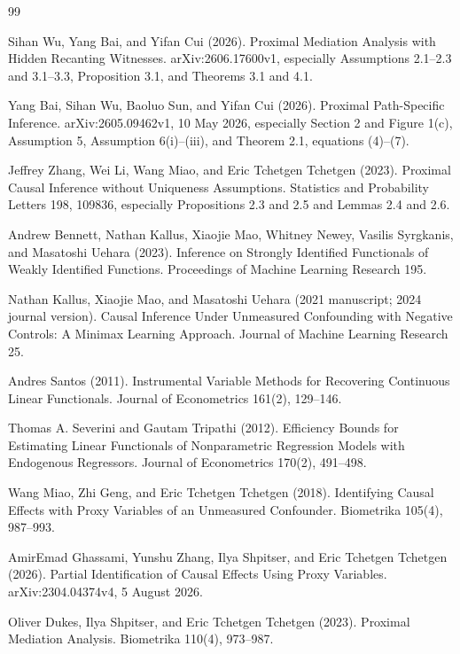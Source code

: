 \documentclass{article}
\begin{document}
\begin{thebibliography}{99}

   Sihan Wu, Yang Bai, and Yifan Cui (2026). Proximal Mediation Analysis with Hidden Recanting Witnesses. arXiv:2606.17600v1, especially Assumptions 2.1--2.3 and 3.1--3.3, Proposition 3.1, and Theorems 3.1 and 4.1.

   Yang Bai, Sihan Wu, Baoluo Sun, and Yifan Cui (2026). Proximal Path-Specific Inference. arXiv:2605.09462v1, 10 May 2026, especially Section 2 and Figure 1(c), Assumption 5, Assumption 6(i)--(iii), and Theorem 2.1, equations (4)--(7).

   Jeffrey Zhang, Wei Li, Wang Miao, and Eric Tchetgen Tchetgen (2023). Proximal Causal Inference without Uniqueness Assumptions. Statistics and Probability Letters 198, 109836, especially Propositions 2.3 and 2.5 and Lemmas 2.4 and 2.6.

   Andrew Bennett, Nathan Kallus, Xiaojie Mao, Whitney Newey, Vasilis Syrgkanis, and Masatoshi Uehara (2023). Inference on Strongly Identified Functionals of Weakly Identified Functions. Proceedings of Machine Learning Research 195.

   Nathan Kallus, Xiaojie Mao, and Masatoshi Uehara (2021 manuscript; 2024 journal version). Causal Inference Under Unmeasured Confounding with Negative Controls: A Minimax Learning Approach. Journal of Machine Learning Research 25.

   Andres Santos (2011). Instrumental Variable Methods for Recovering Continuous Linear Functionals. Journal of Econometrics 161(2), 129--146.

   Thomas A. Severini and Gautam Tripathi (2012). Efficiency Bounds for Estimating Linear Functionals of Nonparametric Regression Models with Endogenous Regressors. Journal of Econometrics 170(2), 491--498.

   Wang Miao, Zhi Geng, and Eric Tchetgen Tchetgen (2018). Identifying Causal Effects with Proxy Variables of an Unmeasured Confounder. Biometrika 105(4), 987--993.

   AmirEmad Ghassami, Yunshu Zhang, Ilya Shpitser, and Eric Tchetgen Tchetgen (2026). Partial Identification of Causal Effects Using Proxy Variables. arXiv:2304.04374v4, 5 August 2026.

   Oliver Dukes, Ilya Shpitser, and Eric Tchetgen Tchetgen (2023). Proximal Mediation Analysis. Biometrika 110(4), 973--987.


\end{thebibliography}
\end{document}
